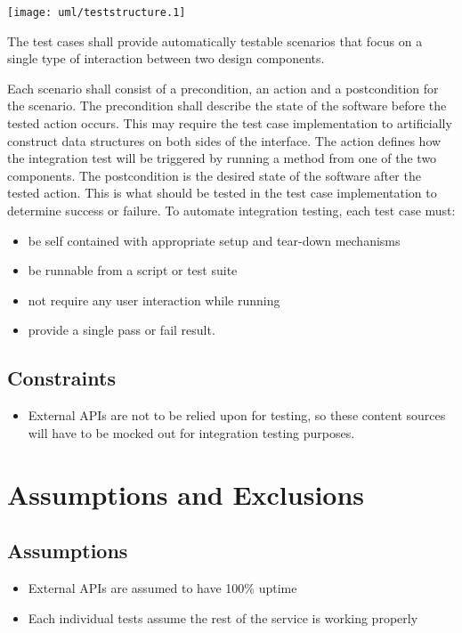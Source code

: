 \documentclass[12pt]{article}
\begin{document}
\begin{centering}
\texttt{[image: uml/teststructure.1]}
\end{centering}

The test cases shall provide automatically testable scenarios that
focus on a single type of interaction between two design components.

Each scenario shall consist of a precondition, an action and a
postcondition for the scenario. The precondition shall describe the
state of the software before the tested action occurs. This may
require the test case implementation to artificially construct data
structures on both sides of the interface. The action defines how the
integration test will be triggered by running a method from one of the
two components. The postcondition is the desired state of the software
after the tested action. This is what should be tested in the test
case implementation to determine success or failure.  To automate
integration testing, each test case must:

\begin{itemize}
\item be self contained with appropriate setup and tear-down
  mechanisms
\item be runnable from a script or test suite
\item not require any user interaction while running
\item provide a single pass or fail result.
\end{itemize}


\subsection{Constraints}
\begin{itemize}
\item External APIs are not to be relied upon for testing, so these content sources will have to be mocked out for integration testing purposes.
\end{itemize}
\section{Assumptions and Exclusions}
\subsection{Assumptions}
\begin{itemize}
\item External APIs are assumed to have 100\% uptime
\item Each individual tests assume the rest of the service is working properly
\end{itemize}
\end{document}

